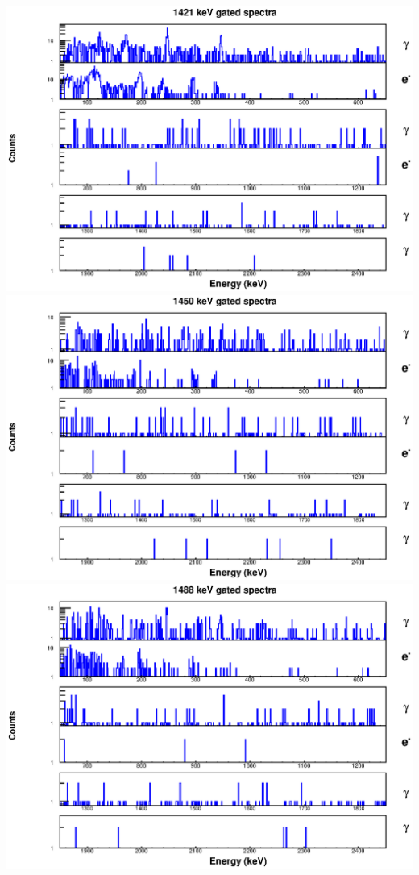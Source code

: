 \begin{landscape}
\includegraphics[scale=1.1]{154Gd_Appendix/1421_combined.eps}
\includegraphics[scale=1.1]{154Gd_Appendix/1450_combined.eps}
\includegraphics[scale=1.1]{154Gd_Appendix/1488_combined.eps}

\end{landscape}
